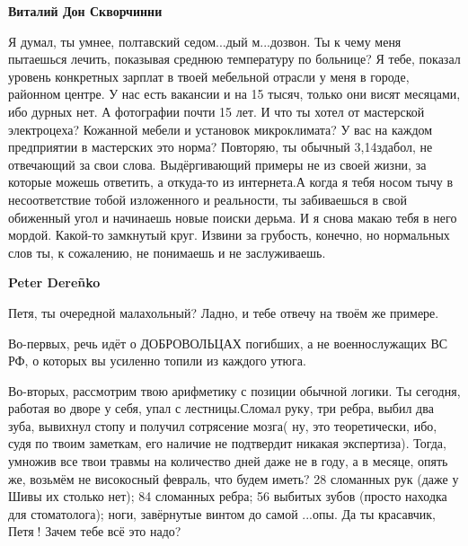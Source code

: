 \begin{itemize}
\begin{itemize}
\textbf{Виталий Дон Скворчинни} 

Я думал, ты умнее, полтавский седом...дый м...дозвон. Ты к чему меня пытаешься
лечить, показывая среднюю температуру по больнице? Я тебе, показал уровень
конкретных зарплат в твоей мебельной отрасли у меня в городе, районном центре.
У нас есть вакансии и на 15 тысяч, только они висят месяцами, ибо дурных нет. А
фотографии почти 15 лет. И что ты хотел от мастерской электроцеха? Кожанной
мебели и установок микроклимата? У вас на каждом предприятии в мастерских это
норма? Повторяю, ты обычный 3,14здабол, не отвечающий за свои слова.
Выдёргивающий примеры не из своей жизни, за которые можешь ответить, а
откуда-то из интернета.А когда я тебя носом тычу в несоответствие тобой
изложенного и реальности, ты забиваешься в свой обиженный угол и начинаешь
новые поиски дерьма. И я снова макаю тебя в него мордой. Какой-то замкнутый
круг. Извини за грубость, конечно, но нормальных слов ты, к сожалению, не
понимаешь и не заслуживаешь.

 
\textbf{Peter Dereñko} 

Петя, ты очередной малахольный? Ладно, и тебе отвечу на твоём же примере.

Во-первых, речь идёт о ДОБРОВОЛЬЦАХ погибших, а не военнослужащих ВС РФ, о
которых вы усиленно топили из каждого утюга. 

Во-вторых, рассмотрим твою арифметику с позиции обычной логики. Ты сегодня,
работая во дворе у себя, упал с лестницы.Сломал руку, три ребра, выбил два
зуба, вывихнул стопу и получил сотрясение мозга( ну, это теоретически, ибо,
судя по твоим заметкам, его наличие не подтвердит никакая экспертиза). Тогда,
умножив все твои травмы на количество дней даже не в году, а в месяце, опять
же, возьмём не високосный февраль, что будем иметь? 28 сломанных рук (даже у
Шивы их столько нет); 84 сломанных ребра; 56 выбитых зубов (просто находка для
стоматолога); ноги, завёрнутые винтом до самой ...опы. Да ты красавчик, Петя🤣!
Зачем тебе всё это надо?

 


\end{itemize}
\end{itemize}
